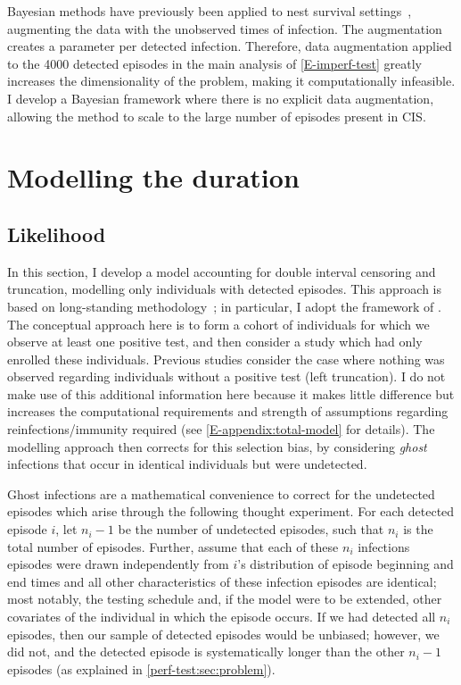\documentclass[thesis.tex]{subfiles}
\begin{document}
Bayesian methods have previously been applied to nest survival settings~\autocites{heBayesiana}{heBayesian}{caoModeling}, augmenting the data with the unobserved times of infection.
The augmentation creates a parameter per detected infection.
Therefore, data augmentation applied to the 4000 detected episodes in the main analysis of \cref{E-imperf-test} greatly increases the dimensionality of the problem, making it computationally infeasible.
I develop a Bayesian framework where there is no explicit data augmentation, allowing the method to scale to the large number of episodes present in CIS.


\section{Modelling the duration}\label{perf-test:sec:model}

\subsection{Likelihood}\label{perf-test:sec:likelihood}

In this section, I develop a model accounting for double interval censoring and truncation, modelling only individuals with detected episodes.
This approach is based on long-standing methodology~\autocites{heiseyModelling}{dempsterMaximum}{turnbullEmpirical}; in particular, I adopt the framework of \textcite{heiseyModelling}.
The conceptual approach here is to form a cohort of individuals for which we observe at least one positive test, and then consider a study which had only enrolled these individuals.
Previous studies consider the case where nothing was observed regarding individuals without a positive test (left truncation).
I do not make use of this additional information here because it makes little difference but increases the computational requirements and strength of assumptions regarding reinfections/immunity required (see \cref{E-appendix:total-model} for details).
The modelling approach then corrects for this selection bias, by considering \emph{ghost} infections that occur in identical individuals but were undetected.

Ghost infections are a mathematical convenience to correct for the undetected episodes which arise through the following thought experiment.
For each detected episode $i$, let $n_i-1$ be the number of undetected episodes, such that $n_i$ is the total number of episodes.
Further, assume that each of these $n_i$ infections episodes were drawn independently from $i$'s distribution of episode beginning and end times and all other characteristics of these infection episodes are identical; most notably, the testing schedule and, if the model were to be extended, other covariates of the individual in which the episode occurs.
If we had detected all $n_i$ episodes, then our sample of detected episodes would be unbiased; however, we did not, and the detected episode is systematically longer than the other $n_i-1$ episodes (as explained in \cref{perf-test:sec:problem}).
\end{document}
